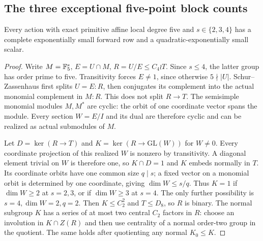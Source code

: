 \subsection{The three exceptional five-point block counts}

\begin{theorem}\label{thm:five-affine-exceptions}
Every action with exact primitive affine local degree five and
$s\in\{2,3,4\}$ has a complete exponentially small forward row
and a quadratic-exponentially small scalar.
\end{theorem}
\begin{proof}
Write $M=\mathbb F_5^s$, $E=U\cap M$, $R=U/E\leq C_4\wr T$.
Since $s\leq4$, the latter group has order prime to five.
Transitivity forces $E\ne1$, since otherwise $5\nmid|U|$.
Schur--Zassenhaus first splits $U=E:R$, then conjugates its
complement into the actual monomial complement in $M:R$.
This does not split $R\to T$. The semisimple monomial modules
$M,M^*$ are cyclic: the orbit of one coordinate vector spans the
module. Every section $W=E/I$ and its dual are therefore cyclic
and can be realized as actual submodules of $M$.

Let $D=\ker(R\to T)$ and $K=\ker(R\to\mathrm{GL}(W))$ for
$W\ne0$. Every coordinate projection of this realized $W$ is
nonzero by transitivity. A diagonal element trivial on $W$ is
therefore one, so $K\cap D=1$ and $K$ embeds normally in $T$.
Its coordinate orbits have one common size $q\mid s$; a fixed
vector on a monomial orbit is determined by one coordinate, giving
$\dim W\leq s/q$. Thus $K=1$ if $\dim W\geq2$ at $s=2,3$,
or if $\dim W\geq3$ at $s=4$. The only further possibility is
$s=4,\dim W=2,q=2$. Then $K\leq C_2^2$ and $T\leq D_8$,
so $R$ is binary. The normal subgroup $K$ has a series of at most
two central $C_2$ factors in $R$: choose an involution in
$K\cap Z(R)$ and then use centrality of a normal order-two group
in the quotient. The same holds after quotienting any normal
$K_0\leq K$.


\end{proof}
